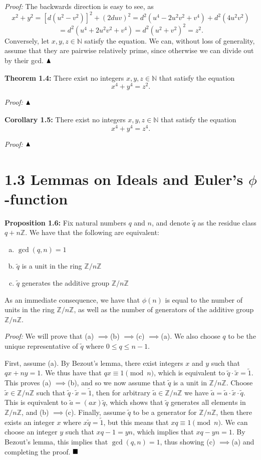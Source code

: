 \documentclass[12pt]{article}
\newcommand{\N}{\ensuremath{\mathbb{N}}}
\newcommand{\Z}{\ensuremath{\mathbb{Z}}}
\newcommand{\proof}{\textit{Proof: }}
\newcommand{\partialdone}{\ensuremath{\strut\hfill\blacktriangle}}
\newcommand{\done}{\ensuremath{\strut\hfill\blacksquare}}
\newcommand{\impl}{\ensuremath{\implies}}
\begin{document}
\proof
The backwards direction is easy to see, as
\[
	x^2 + y^2
	= [d(u^2 - v^2)]^2 + (2duv)^2
	= d^2(u^4 - 2u^2v^2 + v^4) + d^2(4u^2v^2)
\]
\[
	= d^2(u^4 + 2u^2v^2 + v^4)
	= d^2(u^2 + v^2)^2
	= z^2.
\]
Conversely, let \( x, y, z \in \N \) satisfy the equation.
We can, without loss of generality, assume that they are pairwise relatively
prime, since otherwise we can divide out by their gcd.
\partialdone

\textbf{Theorem 1.4:}
There exist no integers \( x, y, z \in \N \) that satisfy the equation
\[
	x^4 + y^4 = z^2.
\]

\proof
\partialdone

\textbf{Corollary 1.5:}
There exist no integers \( x, y, z \in \N \) that satisfy the equation
\[
	x^4 + y^4 = z^4.
\]

\proof
\partialdone

\section*{1.3 Lemmas on Ideals and Euler's \( \phi \)-function}

\textbf{Proposition 1.6:}
Fix natural numbers \( q \) and \( n \), and denote \( \tilde{q} \) as the
residue class \( q + n\Z \).
We have that the following are equivalent:
\begin{enumerate}[(a)]
	\item \( \gcd(q,n) = 1 \)

	\item \( \tilde{q} \) is a unit in the ring \( \Z/n\Z \)

	\item \( \tilde{q} \) generates the additive group \( \Z/n\Z \)
\end{enumerate}
As an immediate consequence, we have that \( \phi(n) \) is equal to the number
of units in the ring \( \Z/n\Z \), as well as the number of generators of the
additive group \( \Z/n\Z \).

\proof
We will prove that (a) \impl (b) \impl (c) \impl (a).
We also choose \( q \) to be the unique representative of \( \tilde{q} \)
where \( 0 \leq q \leq n - 1 \).

First, assume (a).
By Bezout's lemma, there exist integers \( x \) and \( y \) such that
\( qx + ny = 1 \).
We thus have that \( qx \equiv 1 \pmod{n} \), which is equivalent to
\( \tilde{q} \cdot \tilde{x} = \tilde{1} \).
This proves (a) \impl (b), and so we now assume that \( \tilde{q} \) is a unit
in \( \Z/n\Z \).
Choose \( \tilde{x} \in \Z/n\Z \) such that
\( \tilde{q} \cdot \tilde{x} = \tilde{1} \), then for arbitrary
\( \tilde{a} \in \Z/n\Z \) we have
\( \tilde{a} = \tilde{a} \cdot \tilde{x} \cdot \tilde{q} \).
This is equivalent to \( \tilde{a} = (ax)\tilde{q} \), which shows that
\( \tilde{q} \) generates all elements in \( \Z/n\Z \), and (b) \impl (c).
Finally, assume \( \tilde{q} \) to be a generator for \( \Z/n\Z \), then
there exists an integer \( x \) where \( x\tilde{q} = \tilde{1} \), but this
means that \( xq \equiv 1 \pmod{n} \).
We can choose an integer \( y \) such that \( xq - 1 = yn \), which implies
that \( xq - yn = 1 \).
By Bezout's lemma, this implies that \( \gcd(q,n) = 1 \), thus showing
(c) \impl (a) and completing the proof.
\done
\end{document}
